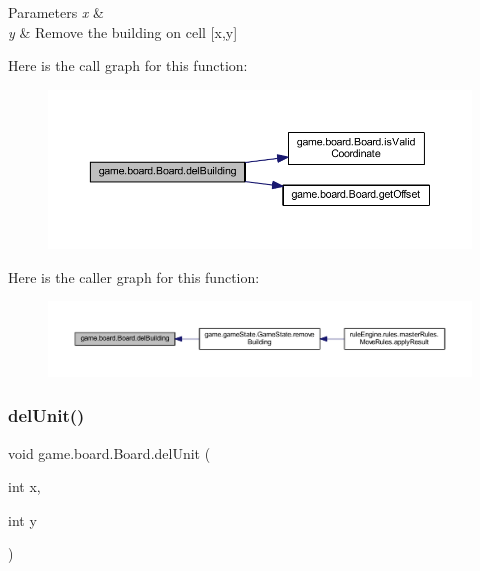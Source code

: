 \begin{DoxyParams}{Parameters}
{\em x} & \\
\hline
{\em y} & Remove the building on cell \mbox{[}x,y\mbox{]} \\
\hline
\end{DoxyParams}
Here is the call graph for this function\+:
\nopagebreak
\begin{figure}[H]
\begin{center}
\leavevmode
\includegraphics[width=350pt]{classgame_1_1board_1_1_board_a2887ad41696ae6aeafc9494ca80f465b_cgraph}
\end{center}
\end{figure}
Here is the caller graph for this function\+:
\nopagebreak
\begin{figure}[H]
\begin{center}
\leavevmode
\includegraphics[width=350pt]{classgame_1_1board_1_1_board_a2887ad41696ae6aeafc9494ca80f465b_icgraph}
\end{center}
\end{figure}
\mbox{\label{classgame_1_1board_1_1_board_a580af354baf71be5405e6876dd78e3f6}} 
\subsubsection{\texorpdfstring{del\+Unit()}{delUnit()}}
{\footnotesize\ttfamily void game.\+board.\+Board.\+del\+Unit (\begin{DoxyParamCaption}\item[{int}]{x,  }\item[{int}]{y }\end{DoxyParamCaption})\hspace{0.3cm}{\ttfamily [inline]}}


